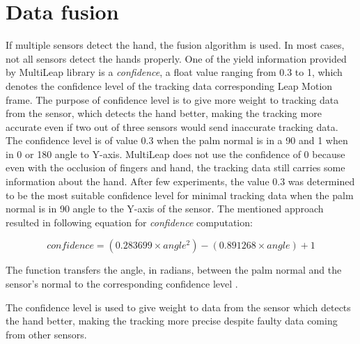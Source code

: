 \section{Data fusion}

If multiple sensors detect the hand, the fusion algorithm is used. In most cases, not all sensors detect the hands properly. One of the yield information provided by MultiLeap library is a \textit{confidence}, a float value ranging from 0.3 to 1, which denotes the confidence level of the tracking data corresponding Leap Motion frame. The purpose of confidence level is to give more weight to tracking data from the sensor, which detects the hand better, making the tracking more accurate even if two out of three sensors would send inaccurate tracking data. The confidence level is of value 0.3 when the palm normal is in a 90\textdegree \xspace and 1 when in 0\textdegree \xspace or 180\textdegree \xspace angle to Y-axis. MultiLeap does not use the confidence of 0 because even with the occlusion of fingers and hand, the tracking data still carries some information about the hand. After few experiments, the value 0.3 was determined to be the most suitable confidence level for minimal tracking data when the palm normal is in 90\textdegree \xspace angle to the Y-axis of the sensor. The mentioned approach resulted in following equation for \textit{confidence} computation:

\begin{equation}
    {confidence = (0.283699 \times angle^2)-(0.891268 \times angle)+1}
\end{equation}

The function transfers the angle, in radians, between the palm normal and the sensor's normal to the corresponding confidence level \cite{tomasMultileap}.

The confidence level is used to give weight to data from the sensor which detects the hand better, making the tracking more precise despite faulty data coming from other sensors.
